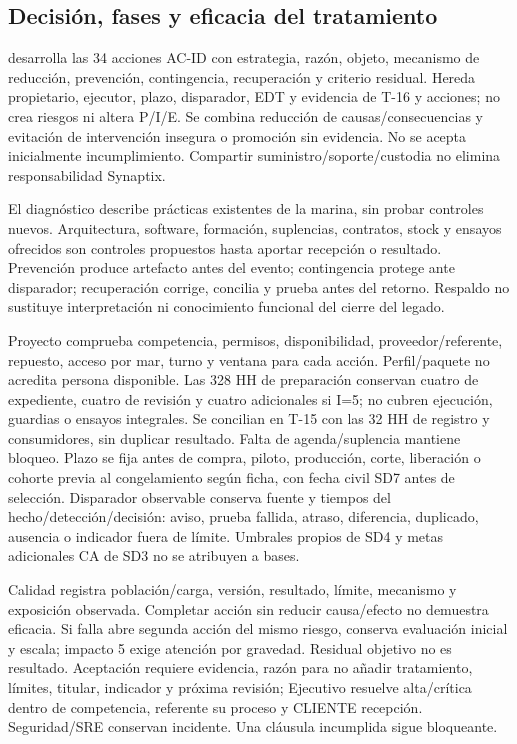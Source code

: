 \subsection{Decisión, fases y eficacia del tratamiento}\label{sec:sd8-tratamiento-p06}
 desarrolla las 34 acciones AC-ID con estrategia, razón, objeto, mecanismo de reducción, prevención, contingencia, recuperación y criterio residual. Hereda propietario, ejecutor, plazo, disparador, EDT y evidencia de T-16 y acciones; no crea riesgos ni altera P/I/E. Se combina reducción de causas/consecuencias y evitación de intervención insegura o promoción sin evidencia. No se acepta inicialmente incumplimiento. Compartir suministro/soporte/custodia no elimina responsabilidad Synaptix. \parencites[Formulario T-7, apartado 10; T-16; pp.~59, 63]{sd8-ba}[RT-19.04; p.~33]{sd8-bt}

El diagnóstico describe prácticas existentes de la marina, sin probar controles nuevos. Arquitectura, software, formación, suplencias, contratos, stock y ensayos ofrecidos son controles propuestos hasta aportar recepción o resultado. Prevención produce artefacto antes del evento; contingencia protege ante disparador; recuperación corrige, concilia y prueba antes del retorno. Respaldo no sustituye interpretación ni conocimiento funcional del cierre del legado.

Proyecto comprueba competencia, permisos, disponibilidad, proveedor/referente, repuesto, acceso por mar, turno y ventana para cada acción. Perfil/paquete no acredita persona disponible. Las 328 HH de preparación conservan cuatro de expediente, cuatro de revisión y cuatro adicionales si I=5; no cubren ejecución, guardias o ensayos integrales. Se concilian en T-15 con las 32 HH de registro y consumidores, sin duplicar resultado. Falta de agenda/suplencia mantiene bloqueo. Plazo se fija antes de compra, piloto, producción, corte, liberación o cohorte previa al congelamiento según ficha, con fecha civil SD7 antes de selección. Disparador observable conserva fuente y tiempos del hecho/detección/decisión: aviso, prueba fallida, atraso, diferencia, duplicado, ausencia o indicador fuera de límite. Umbrales propios de SD4 y metas adicionales CA de SD3 no se atribuyen a bases.

Calidad registra población/carga, versión, resultado, límite, mecanismo y exposición observada. Completar acción sin reducir causa/efecto no demuestra eficacia. Si falla abre segunda acción del mismo riesgo, conserva evaluación inicial y escala; impacto 5 exige atención por gravedad. Residual objetivo no es resultado. Aceptación requiere evidencia, razón para no añadir tratamiento, límites, titular, indicador y próxima revisión; Ejecutivo resuelve alta/crítica dentro de competencia, referente su proceso y CLIENTE recepción. Seguridad/SRE conservan incidente. Una cláusula incumplida sigue bloqueante.

